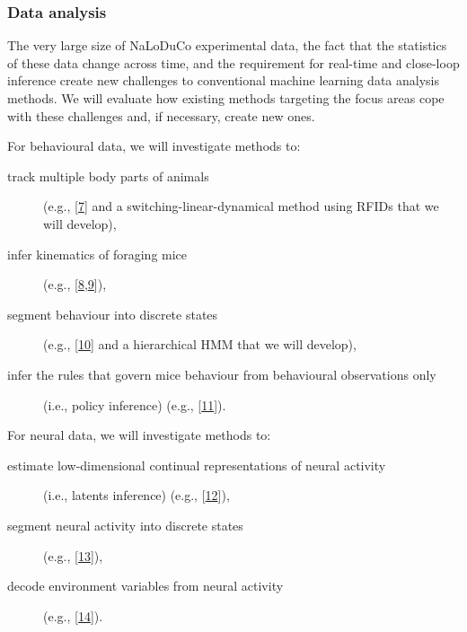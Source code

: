 \subsubsection{Data analysis}

The very large size of NaLoDuCo experimental data, the fact that the statistics
of these data change across time, and the requirement for real-time and
close-loop inference create new challenges to conventional machine learning
data analysis methods.
%
We will evaluate how existing methods targeting the focus areas cope with these
challenges and, if necessary, create new ones.

For behavioural data, we will investigate methods to:

\begin{description}

    \item[track multiple body parts of animals] (e.g.,
        [\href{https://pubmed.ncbi.nlm.nih.gov/30127430/}{7}] and a
        switching-linear-dynamical method using RFIDs that we will develop),

    \item[infer kinematics of foraging mice] (e.g.,
        [\href{https://github.com/joacorapela/lds\_python}{8},\href{https://www.cambridge.org/core/books/fundamentals-of-object-tracking/A543B0EA12957B353BE4B5D0602EE945}{9}]),

    \item[segment behaviour into discrete states] (e.g.,
        [\href{https://pubmed.ncbi.nlm.nih.gov/26687221/}{10}]
        and a hierarchical HMM that we will develop),

    \item[infer the rules that govern mice behaviour from behavioural
        observations only] (i.e., policy inference) (e.g.,
        [\href{https://arxiv.org/abs/2311.13870v2}{11}]).

\end{description}

For neural data, we will investigate methods to:

\begin{description}

    \item[estimate low-dimensional continual representations of neural
        activity]
        (i.e., latents inference) (e.g.,
        [\href{https://papers.nips.cc/paper_files/paper/2011/hash/7143d7fbadfa4693b9eec507d9d37443-Abstract.html}{12}]),

    \item[segment neural activity into discrete states] (e.g.,
        [\href{https://pubmed.ncbi.nlm.nih.gov/21299424/}{13}]),

    \item[decode environment variables from neural activity] (e.g.,
        [\href{https://pubmed.ncbi.nlm.nih.gov/25973549/}{14}]).

\end{description}
